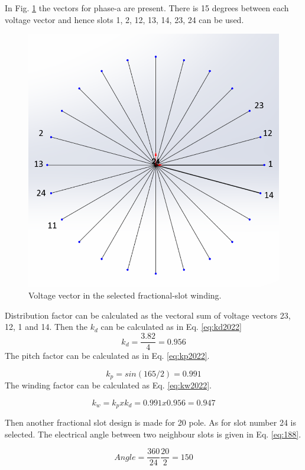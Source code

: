 \documentclass{article}
\begin{document}
In Fig. \ref{fig:22p24svoltage} the vectors for phase-a are present. There is 15 degrees between each voltage vector and hence slots 1, 2, 12, 13, 14, 23, 24 can be used.

\begin{figure}[H]
	\centering
	\includegraphics[width=0.7\linewidth]{Figurler/22p24s_voltage}
	\caption{Voltage vector in the selected fractional-slot winding.}
	\label{fig:22p24svoltage}
\end{figure}

Distribution factor can be calculated as the vectoral sum of voltage vectors 23, 12, 1 and 14. Then the $k_d$ can be calculated as in Eq. \ref{eq:kd2022}
\begin{equation}
k_d=\frac{3.82}{4}=0.956
\label{eq:kd2022}
\end{equation}
The pitch factor can be calculated as in Eq. \ref{eq:kp2022}.

\begin{equation}
k_p=sin(165/2)=0.991
\label{eq:kp2022}
\end{equation}
The winding factor can be calculated as Eq. \ref{eq:kw2022}.

\begin{equation}
k_w=k_pxk_d= 0.991x0.956=0.947
\label{eq:kw2022}
\end{equation}

Then another fractional slot design is made for 20 pole. As for slot number 24 is selected. The electrical angle between two neighbour slots is given in Eq. \ref{eq:188}.

\begin{equation}
Angle=\frac{360}{24}\frac{20}{2}=150
\label{eq:188}
\end{equation}
\end{document}
